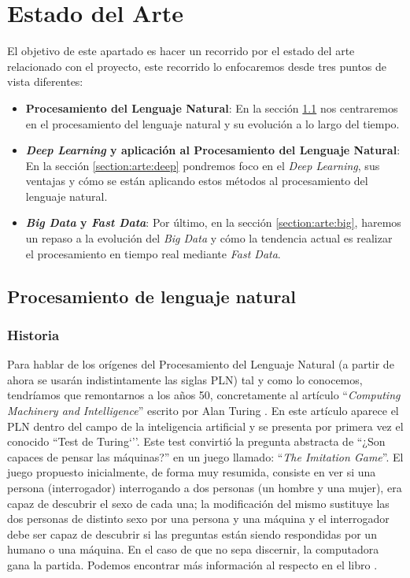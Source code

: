 \chapter{Estado del Arte}
\label{chapter:estadoarte}


El objetivo de este apartado es hacer un recorrido por el estado del arte relacionado con el proyecto, este recorrido lo enfocaremos desde tres puntos de vista diferentes:
\begin{itemize}
	\item \textbf{Procesamiento del Lenguaje Natural}: En la sección \ref{section:arte:pln}  nos centraremos en el procesamiento del lenguaje natural y su evolución a lo largo del tiempo. 
	\item \textbf{\textit{Deep Learning} y aplicación al Procesamiento del Lenguaje Natural}: En la sección \ref{section:arte:deep}  pondremos foco en el \textit{Deep Learning}, sus ventajas y cómo se están aplicando estos métodos al procesamiento del lenguaje natural. 
	\item \textbf{\textit{Big Data} y \textit{Fast Data}}: Por último, en la sección \ref{section:arte:big}, haremos un repaso a la evolución del \textit{Big Data} y cómo la tendencia actual es realizar el procesamiento en tiempo real mediante \textit{Fast Data}.
\end{itemize}

\section{Procesamiento de lenguaje natural}
\label{section:arte:pln}

\subsection{Historia}

Para hablar de los orígenes del Procesamiento del Lenguaje Natural (a partir de ahora se usarán indistintamente las siglas PLN) tal y como lo conocemos, tendríamos que remontarnos a los años 50, concretamente al artículo ``\textit{Computing Machinery and Intelligence}'' escrito por Alan Turing \cite{turing_1950}. En este artículo aparece el PLN dentro del campo de la inteligencia artificial y se presenta por primera vez el conocido ``Test de Turing`''. Este test convirtió la pregunta abstracta de ``¿Son capaces de pensar las máquinas?'' en un juego llamado: ``\textit{The Imitation Game}''. El juego propuesto inicialmente, de forma muy resumida, consiste en ver si una persona (interrogador) interrogando a dos personas (un hombre y una mujer), era capaz de descubrir el sexo de cada una; la modificación del mismo sustituye las dos personas de distinto sexo por una persona y una máquina y el interrogador debe ser capaz de descubrir si las preguntas están siendo respondidas por un humano o una máquina. En el caso de que no sepa discernir, la computadora gana la partida. Podemos encontrar más información al respecto en el libro \cite{turing}.



